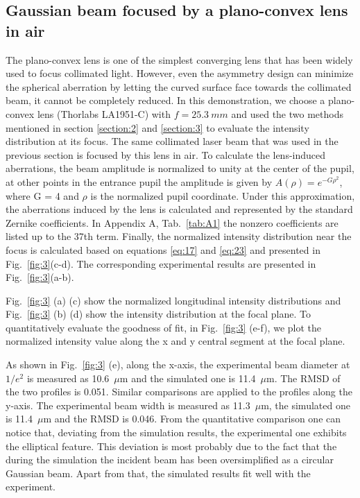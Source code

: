\documentclass[9pt,twocolumn,twoside]{osajnl}
\begin{document}
\subsection{Gaussian beam focused by a plano-convex lens in air}
The plano-convex lens is one of the simplest converging lens that has been widely used to focus collimated light. However, even the asymmetry design can minimize the spherical aberration by letting the curved surface face towards the collimated beam, it cannot be completely reduced. In this demonstration, we choose a plano-convex lens (Thorlabs LA1951-C) with $f = 25.3~mm$ and used the two methods mentioned in section \ref{section:2} and \ref{section:3} to evaluate the intensity distribution at its focus. The same collimated laser beam that was used in the previous section is focused by this lens in air. To calculate the lens-induced aberrations,
the beam amplitude is normalized to unity at the center of the pupil, at other points in the entrance pupil the amplitude is given by $A(\rho)=e^{-G\rho^2}$, where G = 4 and $\rho$ is the normalized pupil coordinate. Under this approximation, the aberrations induced by the lens is calculated and represented by the standard Zernike coefficients. In Appendix A, Tab.~\ref{tab:A1} the nonzero coefficients are listed up to the 37th term. Finally, the normalized intensity distribution near the focus is calculated based on equations \eqref{eq:17} and \eqref{eq:23} and presented in Fig.~\ref{fig:3}(c-d). The corresponding experimental results are presented in Fig.~\ref{fig:3}(a-b).

Fig.~\ref{fig:3} (a) (c) show the normalized longitudinal intensity distributions and Fig.~\ref{fig:3} (b) (d) show the intensity distribution at the focal plane. To quantitatively evaluate the goodness of fit, in Fig.~\ref{fig:3} (e-f), we plot the normalized intensity value along the x and y central segment at the focal plane.

As shown in Fig.~\ref{fig:3} (e), along the x-axis, the experimental beam diameter at $1/e^2$ is measured as 10.6~$\mu$m and the simulated one is 11.4~$\mu$m. The RMSD of the two profiles is 0.051. Similar comparisons are applied to the profiles along the y-axis. The experimental beam width is measured as 11.3~$\mu$m, the simulated one is 11.4~$\mu$m and the RMSD is 0.046. From the quantitative comparison one can notice that, deviating from the simulation results, the experimental one exhibits the elliptical feature. This deviation is most probably due to the fact that the during the simulation the incident beam has been oversimplified as a circular Gaussian beam. Apart from that, the simulated results fit well with the experiment. 
\end{document}
